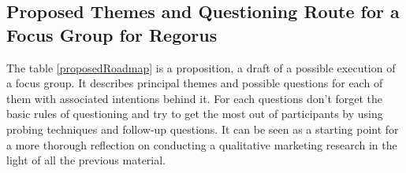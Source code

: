 \documentclass[10pt]{report}
\begin{document}
\subsection{Proposed Themes and Questioning Route for a Focus Group for Regorus}

The table \ref{proposedRoadmap} is a proposition, a draft of a possible execution of a focus group. It describes principal themes and possible questions for each of them with associated intentions behind it. For each questions don't forget the basic rules of questioning and try to get the most out of participants by using probing techniques and follow-up questions. It can be seen as a starting point for a more thorough reflection on conducting a qualitative marketing research in the light of all the previous material.



\renewcommand{\familydefault}{\sfdefault}
\renewcommand{\arraystretch}{1.5}


\newpage
{}





\newpage


\newpage

\pagestyle{plain}

\nocite{*}
\setlength{\bibitemsep}{5pt}

\printbibliography[title={Technological references},keyword={tech}, heading=subbibliography]
\printbibliography[title={Strategic references},keyword={strat}, heading=subbibliography]

\printbibliography[title={Other references}, notkeyword={tech}, notkeyword={strat}, heading=subbibliography]
\end{document}
